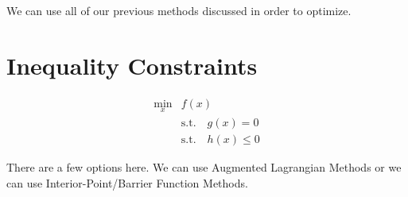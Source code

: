 \documentclass{article}
\begin{document}
We can use all of our previous methods discussed in order to optimize.

\section{Inequality Constraints}

\begin{align}
    \min_x & f(x) \\
    &\mathrm{s.t.} \quad g(x) = 0 \\
    &\mathrm{s.t.} \quad h(x) \leq 0
\end{align}

There are a few options here. We can use Augmented Lagrangian Methods or we can use Interior-Point/Barrier Function Methods.
\end{document}
